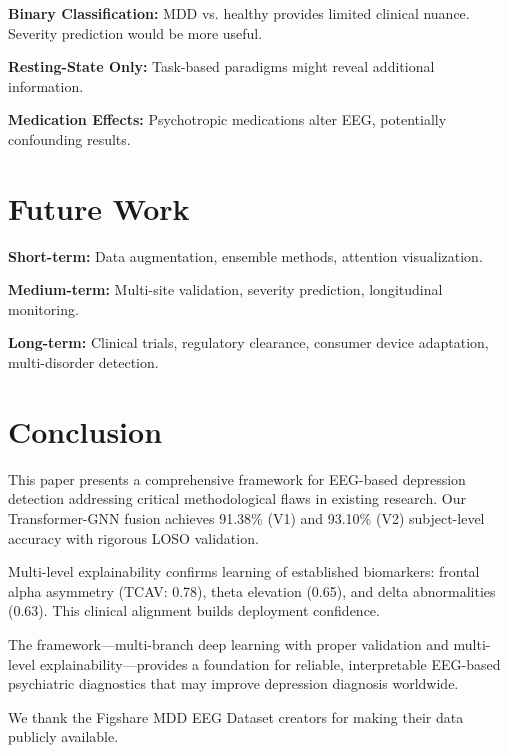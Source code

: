 \documentclass[blue,fullpaper]{ludusofficial}  %
\begin{document}
\textbf{Binary Classification:} MDD vs. healthy provides limited clinical nuance. Severity prediction would be more useful.

\textbf{Resting-State Only:} Task-based paradigms might reveal additional information.

\textbf{Medication Effects:} Psychotropic medications alter EEG, potentially confounding results.

\section{Future Work}

\textbf{Short-term:} Data augmentation, ensemble methods, attention visualization.

\textbf{Medium-term:} Multi-site validation, severity prediction, longitudinal monitoring.

\textbf{Long-term:} Clinical trials, regulatory clearance, consumer device adaptation, multi-disorder detection.

\section{Conclusion}

This paper presents a comprehensive framework for EEG-based depression detection addressing critical methodological flaws in existing research. Our Transformer-GNN fusion achieves 91.38\% (V1) and 93.10\% (V2) subject-level accuracy with rigorous LOSO validation.

Multi-level explainability confirms learning of established biomarkers: frontal alpha asymmetry (TCAV: 0.78), theta elevation (0.65), and delta abnormalities (0.63). This clinical alignment builds deployment confidence.

The framework—multi-branch deep learning with proper validation and multi-level explainability—provides a foundation for reliable, interpretable EEG-based psychiatric diagnostics that may improve depression diagnosis worldwide.

\begin{acknowledgments}
We thank the Figshare MDD EEG Dataset creators for making their data publicly available.
\end{acknowledgments}



\end{document}
